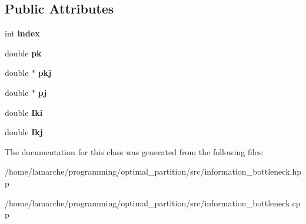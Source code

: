 \subsection*{Public Attributes}
\begin{DoxyCompactItemize}
\item 
\hypertarget{classBottleneckObjectiveValue_a6229987020b8634ca238bb7d6d8904db}{int {\bfseries index}}\label{classBottleneckObjectiveValue_a6229987020b8634ca238bb7d6d8904db}

\item 
\hypertarget{classBottleneckObjectiveValue_a0e9546f57c845f33372ac3db29f8ea25}{double {\bfseries pk}}\label{classBottleneckObjectiveValue_a0e9546f57c845f33372ac3db29f8ea25}

\item 
\hypertarget{classBottleneckObjectiveValue_ac823f5e398f9ae9c75fe9151b29aac5b}{double $\ast$ {\bfseries pkj}}\label{classBottleneckObjectiveValue_ac823f5e398f9ae9c75fe9151b29aac5b}

\item 
\hypertarget{classBottleneckObjectiveValue_ac6c6fa26dac3f438159c5c7c6f1b4f3b}{double $\ast$ {\bfseries pj}}\label{classBottleneckObjectiveValue_ac6c6fa26dac3f438159c5c7c6f1b4f3b}

\item 
\hypertarget{classBottleneckObjectiveValue_a227ccad30a07de0b38e4678940b06338}{double {\bfseries Iki}}\label{classBottleneckObjectiveValue_a227ccad30a07de0b38e4678940b06338}

\item 
\hypertarget{classBottleneckObjectiveValue_a40c60ab77263afa0738968433d2d425f}{double {\bfseries Ikj}}\label{classBottleneckObjectiveValue_a40c60ab77263afa0738968433d2d425f}

\end{DoxyCompactItemize}


The documentation for this class was generated from the following files\-:\begin{DoxyCompactItemize}
\item 
/home/lamarche/programming/optimal\-\_\-partition/src/information\-\_\-bottleneck.\-hpp\item 
/home/lamarche/programming/optimal\-\_\-partition/src/information\-\_\-bottleneck.\-cpp\end{DoxyCompactItemize}
